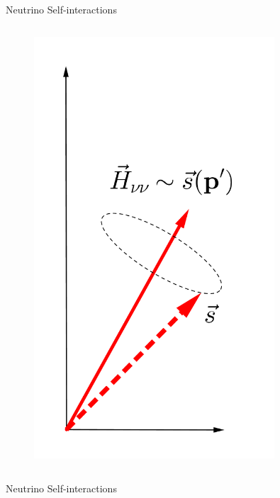 \documentclass[9pt]{beamer}
\begin{document}
\begin{darkframes}
\begin{frame}{Neutrino Self-interactions}
\begin{columns}[T]
\begin{column}{0.5\textwidth}
      \begin{figure}
         \includegraphics[width=0.8\textwidth]{assets/self-interaction}
      \end{figure}




   \end{column}


\end{columns}





\end{frame}

\begin{frame}{Neutrino Self-interactions}

\begin{columns}[T]

\begin{column}{0.3\textwidth}


\end{column}
\end{columns}
\end{frame}
\end{darkframes}
\end{document}
